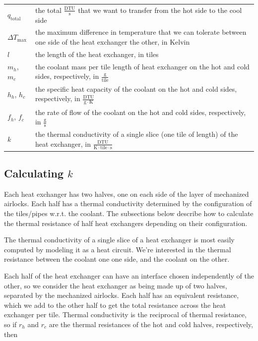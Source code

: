 \documentclass{article}
\numberwithin{equation}{subsection}
\theoremstyle{remark}
\newcommand{\qtotal}{q_{\mathrm{total}}}
\newcommand{\DeltaT}{\Delta{}T}
\newcommand{\DeltaTmax}{\DeltaT_{\mathrm{max}}}
\newenvironment{definitiontable}{
\renewcommand{\arraystretch}{1.5}
\begin{tabular}{lp{0.8\textwidth}}
}
{
\end{tabular}
\renewcommand{\arraystretch}{1.0}
}
\begin{document}
\begin{definitiontable}
\(\qtotal\) & the total \(\frac{\mathrm{DTU}}{\mathrm{s}}\) that we want to transfer from the hot side to the cool side \\

\(\DeltaTmax\) & the maximum difference in temperature that we can tolerate between one side of the heat exchanger the other, in Kelvin \\

\(l\) & the length of the heat exchanger, in tiles \\

\(m_{h}\), \(m_{c}\) & the coolant mass per tile length of heat exchanger on the hot and cold sides, respectively, in \(\frac{\mathrm{g}}{\mathrm{tile}}\) \\

\(h_{h}\), \(h_{c}\) & the specific heat capacity of the coolant on the hot and cold sides, respectively, in \(\frac{\mathrm{DTU}}{\mathrm{g} \cdot \mathrm{K}}\) \\

\(f_{h}\), \(f_{c}\) & the rate of flow of the coolant on the hot and cold sides, respectively, in \(\frac{\mathrm{g}}{\mathrm{s}}\) \\

\(k\) & the thermal conductivity of a single slice (one tile of length) of the heat exchanger, in \(\frac{\mathrm{DTU}}{\mathrm{K} \cdot \mathrm{tile} \cdot \mathrm{s}}\) \\
\end{definitiontable}

\subsection{Calculating \(k\)}

Each heat exchanger has two halves, one on each side of the layer of mechanized airlocks.
Each half has a thermal conductivity determined by the configuration of the tiles/pipes w.r.t. the coolant.
The subsections below describe how to calculate the thermal resistance of half heat exchangers depending on their configuration.

The thermal conductivity of a single slice of a heat exchanger is most easily computed by modeling it as a heat circuit.
We're interested in the thermal resistance between the coolant one one side, and the coolant on the other.

Each half of the heat exchanger can have an interface chosen independently of the other, so we consider the heat exchanger as being made up of two halves, separated by the mechanized airlocks.
Each half has an equivalent resistance, which we add to the other half to get the total resistance across the heat exchanger per tile.
Thermal conductivity is the reciprocal of thermal resistance, so if \(r_{h}\) and \(r_{c}\) are the thermal resistances of the hot and cold halves, respectively, then
\end{document}

